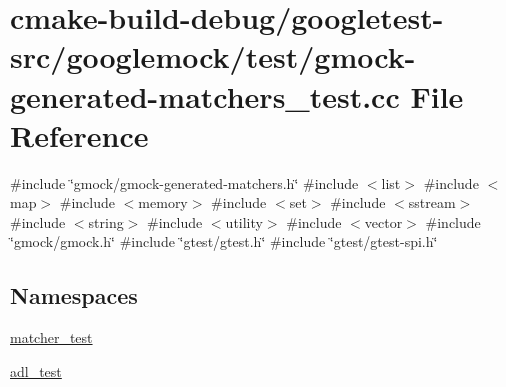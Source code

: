 \hypertarget{gmock-generated-matchers__test_8cc}{}\section{cmake-\/build-\/debug/googletest-\/src/googlemock/test/gmock-\/generated-\/matchers\+\_\+test.cc File Reference}
\label{gmock-generated-matchers__test_8cc}
{\ttfamily \#include \char`\"{}gmock/gmock-\/generated-\/matchers.\+h\char`\"{}}\newline
{\ttfamily \#include $<$list$>$}\newline
{\ttfamily \#include $<$map$>$}\newline
{\ttfamily \#include $<$memory$>$}\newline
{\ttfamily \#include $<$set$>$}\newline
{\ttfamily \#include $<$sstream$>$}\newline
{\ttfamily \#include $<$string$>$}\newline
{\ttfamily \#include $<$utility$>$}\newline
{\ttfamily \#include $<$vector$>$}\newline
{\ttfamily \#include \char`\"{}gmock/gmock.\+h\char`\"{}}\newline
{\ttfamily \#include \char`\"{}gtest/gtest.\+h\char`\"{}}\newline
{\ttfamily \#include \char`\"{}gtest/gtest-\/spi.\+h\char`\"{}}\newline
\subsection*{Namespaces}
\begin{DoxyCompactItemize}
\item 
 \mbox{\hyperlink{namespacematcher__test}{matcher\+\_\+test}}
\item 
 \mbox{\hyperlink{namespaceadl__test}{adl\+\_\+test}}
\end{DoxyCompactItemize}
